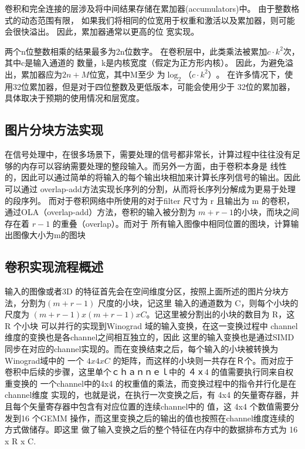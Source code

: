 卷积和完全连接的层涉及将中间结果存储在累加器(accumulators)中。 由于整数格式的动态范围有限，
如果我们将相同的位宽用于权重和激活以及累加器，则可能会很快溢出。 因此，累加器通常以更高的位
宽实现。

两个n位整数相乘的结果最多为2n位数字。 在卷积层中，此类乘法被累加$c·k^2$次，其中c是输入通道的
数量，k是内核宽度（假定为正方形内核）。 因此，为避免溢出，累加器应为$2n + M$位宽，其中M至少
为$\log_2（c⋅k^2）$。 在许多情况下，使用32位累加器，但是对于四位整数及更低版本，可能会使用少于
32位的累加器，具体取决于预期的使用情况和层宽度。

\subsection{图片分块方法实现}
在信号处理中，在很多场景下，需要处理的信号都非常长，计算过程中往往没有足够的内存可以容纳需要处理的整段输入。而另外一方面，由于卷积本身是
线性的，因此可以通过简单的将输入的每个输出块相加来计算长序列信号的输出。因此可以通过 overlap-add方法实现长序列的分割，从而将长序列分解成为更易于处理的段序列。
而对于卷积网络中所使用的对于filter 尺寸为 r 且输出为 m 的卷积，通过OLA（overlap-add）方法，卷积的输入被分割为 $m + r - 1$的小块，而块之间存在着 $r-1$ 的重叠（overlap）。而对于
所有输入图像中相同位置的图块，计算输出图像大小为m的图块


\subsection{卷积实现流程概述}

输入的图像或者3D 的特征首先会在空间维度分区，按照上面所述的图片分块方法，分割为$(m+r-1)$ 尺度的小块，记这里
输入的通道数为 C，则每个小块的尺度为 $ (m+r-1) x (m+r-1) x C $。记这里被分割出的小块的数目为 R，这 R 个小块
可以并行的实现到Winograd 域的输入变换，在这一变换过程中 channel维度的变换也是各channel之间相互独立的，因此
这里的输入变换也是通过SIMD 同步在对应的channel实现的。而在变换结束之后，每个输入的小块被转换为Winograd域中的
一个 $ 4 x 4 x C $ 的矩阵，而这样的小块则一共存在Ｒ个。而对应于卷积中后续的步骤，这里单个ｃｈａｎｎｅｌ中的
４ｘ4 的值需要执行同来自权重变换的 一个channel中的4x4 的权重值的乘法，而变换过程中的指令并行化是在channel维度
实现的，也就是说，在执行一次变换之后，有 4x4 的矢量寄存器，并且每个矢量寄存器中包含有对应位置的连续channel中的
值，这 4x4 个数值需要分发到16 个GEMM 操作，而这里变换之后的输出的值也按照在channel维度连续的方式做储存。即这里
做了输入变换之后的整个特征在内存中的数据排布方式为 16 x R x C. 

